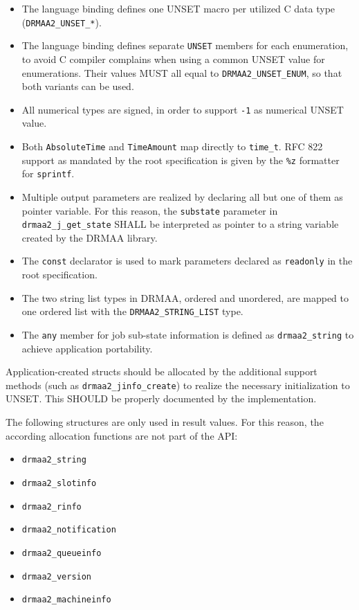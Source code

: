 \documentclass{article}
\newcommand{\h}[1]{\texttt{#1}}
\newcommand{\rat}[1]{}
\begin{document}
\begin{itemize}
\item The language binding defines one UNSET macro per utilized C data type (\h{DRMAA2\_UNSET\_*}). \rat{For UNSET values, the language binding adheres mainly to typical language conventions and not to GLUE as recommended in the root spec.}
\item The language binding defines separate \h{UNSET} members for each enumeration, to avoid C compiler complains when using a common UNSET value for enumerations. Their values MUST all equal to \h{DRMAA2\_UNSET\_ENUM}, so that both variants can be used.
\item  All numerical types are signed, in order to support \h{-1} as numerical UNSET value.
\item Both \h{AbsoluteTime} and \h{TimeAmount} map directly to \h{time\_t}. RFC 822 support as mandated by the root specification is given by the \h{\%z} formatter for \h{sprintf}.
\item Multiple output parameters are realized by declaring all but one of them as pointer variable. For this reason, the \h{substate} parameter in \h{drmaa2\_j\_get\_state} SHALL be interpreted as pointer to a string variable created by the DRMAA library.
\item The \h{const} declarator is used to mark parameters declared as \h{readonly} in the root specification.
\item The two string list types in DRMAA, ordered and unordered, are mapped to one ordered list with the \h{DRMAA2\_STRING\_LIST} type.
\item The \h{any} member for job sub-state information is defined as \h{drmaa2\_string} to achieve application portability.
\end{itemize}

Application-created structs should be allocated by the additional support methods (such as \h{drmaa2\_jinfo\_create}) to realize the necessary initialization to UNSET. This SHOULD be properly documented by the implementation.

The following structures are only used in result values. For this reason, the according allocation functions are not part of the API:

\begin{itemize}
\item \h{drmaa2\_string}
\item \h{drmaa2\_slotinfo}
\item \h{drmaa2\_rinfo}
\item \h{drmaa2\_notification}
\item \h{drmaa2\_queueinfo}
\item \h{drmaa2\_version}
\item \h{drmaa2\_machineinfo}
\end{itemize}
\end{document}
